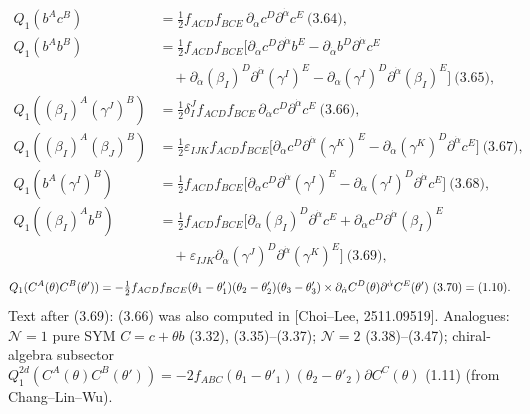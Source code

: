 \documentclass[10pt]{article}
\begin{document}
\begin{align*}
Q_1(b^Ac^B)&=\tfrac12f_{ACD}f_{BCE}\,\partial_{\dot\alpha}c^D\partial^{\dot\alpha}c^E\ \text{(3.64)},\\
Q_1(b^Ab^B)&=\tfrac12f_{ACD}f_{BCE}\big[\partial_{\dot\alpha}c^D\partial^{\dot\alpha}b^E-\partial_{\dot\alpha}b^D\partial^{\dot\alpha}c^E\\&\quad+\partial_{\dot\alpha}(\beta_I)^D\partial^{\dot\alpha}(\gamma^I)^E-\partial_{\dot\alpha}(\gamma^I)^D\partial^{\dot\alpha}(\beta_I)^E\big]\ \text{(3.65)},\\
Q_1((\beta_I)^A(\gamma^J)^B)&=\tfrac12\delta^J_If_{ACD}f_{BCE}\,\partial_{\dot\alpha}c^D\partial^{\dot\alpha}c^E\ \text{(3.66)},\\
Q_1((\beta_I)^A(\beta_J)^B)&=\tfrac12\varepsilon_{IJK}f_{ACD}f_{BCE}\big[\partial_{\dot\alpha}c^D\partial^{\dot\alpha}(\gamma^K)^E-\partial_{\dot\alpha}(\gamma^K)^D\partial^{\dot\alpha}c^E\big]\ \text{(3.67)},\\
Q_1(b^A(\gamma^I)^B)&=\tfrac12f_{ACD}f_{BCE}\big[\partial_{\dot\alpha}c^D\partial^{\dot\alpha}(\gamma^I)^E-\partial_{\dot\alpha}(\gamma^I)^D\partial^{\dot\alpha}c^E\big]\ \text{(3.68)},\\
Q_1((\beta_I)^Ab^B)&=\tfrac12f_{ACD}f_{BCE}\big[\partial_{\dot\alpha}(\beta_I)^D\partial^{\dot\alpha}c^E+\partial_{\dot\alpha}c^D\partial^{\dot\alpha}(\beta_I)^E\\&\quad+\varepsilon_{IJK}\partial_{\dot\alpha}(\gamma^J)^D\partial^{\dot\alpha}(\gamma^K)^E\big]\ \text{(3.69)},
\end{align*}
\begin{equation*}
Q_1(C^A(\theta)C^B(\theta'))=-\tfrac12f_{ACD}f_{BCE}(\theta_1-\theta'_1)(\theta_2-\theta'_2)(\theta_3-\theta'_3)\\\times\partial_{\dot\alpha}C^D(\theta)\partial^{\dot\alpha}C^E(\theta')\ \text{(3.70)}=\text{(1.10)}.
\end{equation*}
Text after (3.69): (3.66) was also computed in [Choi--Lee, 2511.09519]. Analogues: $\mathcal N=1$ pure SYM $C=c+\theta b$ (3.32), (3.35)--(3.37); $\mathcal N=2$ (3.38)--(3.47); chiral-algebra subsector $Q_1^{2d}(C^A(\theta)C^B(\theta'))=-2f_{ABC}(\theta_1-\theta'_1)(\theta_2-\theta'_2)\partial C^C(\theta)$ (1.11) (from Chang--Lin--Wu).
\end{document}
